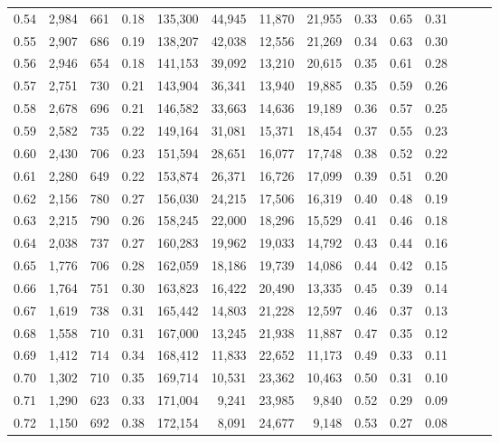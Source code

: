 \begin{tabular}{rrrrrrrrrrrrrr}
0.54 &  2,984 &  661 &  0.18 &  135,300 &   44,945 &  11,870 &  21,955 &  0.33 &  0.65 &      0.31 \\
0.55 &  2,907 &  686 &  0.19 &  138,207 &   42,038 &  12,556 &  21,269 &  0.34 &  0.63 &      0.30 \\
0.56 &  2,946 &  654 &  0.18 &  141,153 &   39,092 &  13,210 &  20,615 &  0.35 &  0.61 &      0.28 \\
0.57 &  2,751 &  730 &  0.21 &  143,904 &   36,341 &  13,940 &  19,885 &  0.35 &  0.59 &      0.26 \\
0.58 &  2,678 &  696 &  0.21 &  146,582 &   33,663 &  14,636 &  19,189 &  0.36 &  0.57 &      0.25 \\
0.59 &  2,582 &  735 &  0.22 &  149,164 &   31,081 &  15,371 &  18,454 &  0.37 &  0.55 &      0.23 \\
0.60 &  2,430 &  706 &  0.23 &  151,594 &   28,651 &  16,077 &  17,748 &  0.38 &  0.52 &      0.22 \\
0.61 &  2,280 &  649 &  0.22 &  153,874 &   26,371 &  16,726 &  17,099 &  0.39 &  0.51 &      0.20 \\
0.62 &  2,156 &  780 &  0.27 &  156,030 &   24,215 &  17,506 &  16,319 &  0.40 &  0.48 &      0.19 \\
0.63 &  2,215 &  790 &  0.26 &  158,245 &   22,000 &  18,296 &  15,529 &  0.41 &  0.46 &      0.18 \\
0.64 &  2,038 &  737 &  0.27 &  160,283 &   19,962 &  19,033 &  14,792 &  0.43 &  0.44 &      0.16 \\
0.65 &  1,776 &  706 &  0.28 &  162,059 &   18,186 &  19,739 &  14,086 &  0.44 &  0.42 &      0.15 \\
0.66 &  1,764 &  751 &  0.30 &  163,823 &   16,422 &  20,490 &  13,335 &  0.45 &  0.39 &      0.14 \\
0.67 &  1,619 &  738 &  0.31 &  165,442 &   14,803 &  21,228 &  12,597 &  0.46 &  0.37 &      0.13 \\
0.68 &  1,558 &  710 &  0.31 &  167,000 &   13,245 &  21,938 &  11,887 &  0.47 &  0.35 &      0.12 \\
0.69 &  1,412 &  714 &  0.34 &  168,412 &   11,833 &  22,652 &  11,173 &  0.49 &  0.33 &      0.11 \\
0.70 &  1,302 &  710 &  0.35 &  169,714 &   10,531 &  23,362 &  10,463 &  0.50 &  0.31 &      0.10 \\
0.71 &  1,290 &  623 &  0.33 &  171,004 &    9,241 &  23,985 &   9,840 &  0.52 &  0.29 &      0.09 \\
0.72 &  1,150 &  692 &  0.38 &  172,154 &    8,091 &  24,677 &   9,148 &  0.53 &  0.27 &      0.08 \\

\end{tabular}

